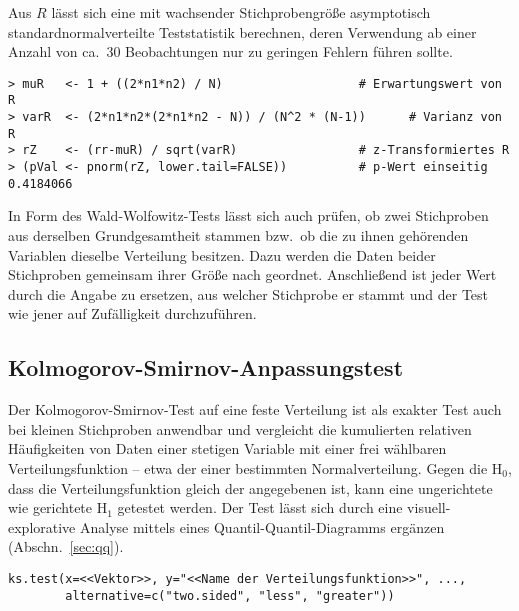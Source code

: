 Aus $R$ lässt sich eine mit wachsender Stichprobengröße asymptotisch standardnormalverteilte Teststatistik berechnen, deren Verwendung ab einer Anzahl von ca.\ $30$ Beobachtungen nur zu geringen Fehlern führen sollte.
\begin{lstlisting}
> muR   <- 1 + ((2*n1*n2) / N)                   # Erwartungswert von R
> varR  <- (2*n1*n2*(2*n1*n2 - N)) / (N^2 * (N-1))      # Varianz von R
> rZ    <- (rr-muR) / sqrt(varR)                 # z-Transformiertes R
> (pVal <- pnorm(rZ, lower.tail=FALSE))          # p-Wert einseitig
0.4184066
\end{lstlisting}

In Form des Wald-Wolfowitz-Tests lässt sich auch prüfen, ob zwei Stichproben aus derselben Grundgesamtheit stammen bzw.\ ob die zu ihnen gehörenden Variablen dieselbe Verteilung besitzen. Dazu werden die Daten beider Stichproben gemeinsam ihrer Größe nach geordnet. Anschließend ist jeder Wert durch die Angabe zu ersetzen, aus welcher Stichprobe er stammt und der Test wie jener auf Zufälligkeit durchzuführen.

\subsection{Kolmogorov-Smirnov-Anpassungstest}
\label{sec:ksTest}

Der Kolmogorov-Smirnov-Test auf eine feste Verteilung ist als exakter Test auch bei kleinen Stichproben anwendbar und vergleicht die kumulierten relativen Häufigkeiten von Daten einer stetigen Variable mit einer frei wählbaren Verteilungsfunktion -- etwa der einer bestimmten Normalverteilung. Gegen die $\text{H}_{0}$, dass die Verteilungsfunktion gleich der angegebenen ist, kann eine ungerichtete wie gerichtete $\text{H}_{1}$ getestet werden. Der Test lässt sich durch eine visuell-explorative Analyse mittels eines Quantil-Quantil-Diagramms ergänzen (Abschn.\ \ref{sec:qq}).
\begin{lstlisting}
ks.test(x=<<Vektor>>, y="<<Name der Verteilungsfunktion>>", ...,
        alternative=c("two.sided", "less", "greater"))
\end{lstlisting}

